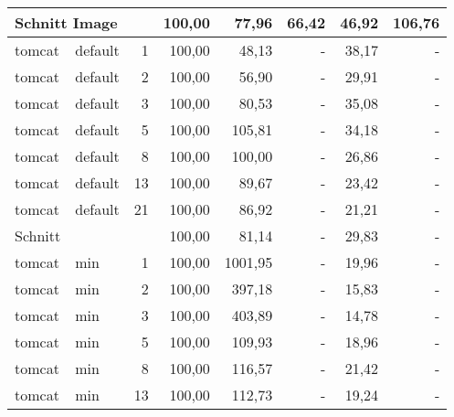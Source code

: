 \begin{footnotesize}
\begin{longtable}{llrrrrrr}
		\multicolumn{2}{l}{Schnitt Image} &            & 100,00 & 77,96                       & 66,42                          & 46,92  & 106,76 \\ \hline
		tomcat         & default & 1          & 100,00 & 48,13                       & -                              & 38,17  & -      \\
		tomcat         & default & 2          & 100,00 & 56,90                       & -                              & 29,91  & -      \\
		tomcat         & default & 3          & 100,00 & 80,53                       & -                              & 35,08  & -      \\
		tomcat         & default & 5          & 100,00 & 105,81                      & -                              & 34,18  & -      \\
		tomcat         & default & 8          & 100,00 & \cellcolor[HTML]{C0C0C0}100,00 & -                              & 26,86  & -      \\
		tomcat         & default & 13         & 100,00 & 89,67                       & -                              & 23,42  & -      \\
		tomcat         & default & 21         & 100,00 & 86,92                       & -                              & 21,21  & -      \\ \hline
		Schnitt        &         &            & 100,00 & 81,14                       & -                              & 29,83  & -      \\ \hline
		tomcat         & min     & 1          & 100,00 & 1001,95                     & -                              & 19,96  & -      \\
		tomcat         & min     & 2          & 100,00 & 397,18                      & -                              & 15,83  & -      \\
		tomcat         & min     & 3          & 100,00 & 403,89                      & -                              & 14,78  & -      \\
		tomcat         & min     & 5          & 100,00 & 109,93                      & -                              & 18,96  & -      \\
		tomcat         & min     & 8          & 100,00 & 116,57                      & -                              & 21,42  & -      \\
		tomcat         & min     & 13         & 100,00 & 112,73                      & -                              & 19,24  & -      \\

\end{longtable}
\end{footnotesize}

